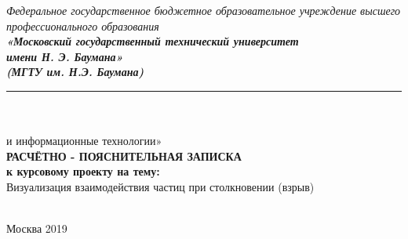 \begin{center}

	\textit{
		\normalsize{Федеральное государственное бюджетное образовательное учреждение высшего профессионального образования
}}\\ 
	
	\textit{
		\normalsize  {\bf  «Московский государственный технический университет}\\ 
		\normalsize  {\bf имени Н. Э. Баумана»}\\
		\normalsize  {\bf (МГТУ им. Н.Э. Баумана)}\\
	}
	\noindent\rule{\textwidth}{2pt}
	\hfill \break
	\noindent
	\\
	\noindent
	\\{ и информационные технологии»}%
	\\
	\hfill\break
	\hfill \break
	\hfill \break
	\hfill \break
	\normalsize{\bf РАСЧЁТНО - ПОЯСНИТЕЛЬНАЯ ЗАПИСКА}\\
	\normalsize{\bf к курсовому проекту на тему:}\\
	\hfill \break
	\large{Визуализация взаимодействия частиц при столкновении (взрыв)}\\
	\hfill \break
	\hfill \break
	\hfill \break
	\hfill \break
	\hfill \break	
	\normalsize {
		\noindent
		\makebox[\textwidth][c]{}%
	}\\
	\hfill \break	
	\normalsize {
		\noindent
		\makebox[\textwidth][c]{ ~~~~~~~~      }%
	}
\end{center}

\hfill

\begin{center} Москва 2019

\end{center}

\thispagestyle{empty} %
